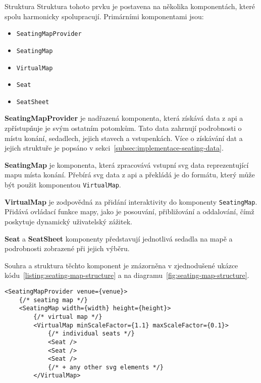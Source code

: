 \begin{subsection}{Struktura}
    \label{subsec:implementace-seating-struktura}
    Struktura tohoto prvku je postavena na několika komponentách, které spolu harmonicky spolupracují.
    Primárními komponentami jsou:

    \begin{itemize}
        \item \texttt{SeatingMapProvider}
        \item \texttt{SeatingMap}
        \item \texttt{VirtualMap}
        \item \texttt{Seat}
        \item \texttt{SeatSheet}
    \end{itemize}

    \textbf{SeatingMapProvider} je nadřazená komponenta, která získává data z \ac{api} a zpřístupňuje je svým ostatním potomkům.
    Tato data zahrnují podrobnosti o místu konání, sedadlech, jejich stavech a vstupenkách.
    Více o získávání dat a jejich struktuře je popsáno v sekci~\ref{subsec:implementace-seating-data}.

    \textbf{SeatingMap} je komponenta, která zpracovává vstupní \ac{svg} data reprezentující mapu místa konání.
    Přebírá \ac{svg} data z \ac{api} a překládá je do formátu, který může být použit komponentou \texttt{VirtualMap}.

    \textbf{VirtualMap} je zodpovědná za přidání interaktivity do komponenty \texttt{SeatingMap}.
    Přidává ovládací funkce mapy, jako je posouvání, přibližování a oddalování, čímž poskytuje dynamický uživatelský zážitek.

    \textbf{Seat} a \textbf{SeatSheet} komponenty představují jednotlivá sedadla na mapě a podrobnosti zobrazené při jejich výběru.

    Souhra a struktura těchto komponent je znázorněna v zjednodušené ukázce kódu~\ref{listing:seating-map-structure} a na diagramu~\ref{fig:seating-map-structure}.

    \begin{listing}[H]
        \begin{verbatim}
<SeatingMapProvider venue={venue}>
	{/* seating map */}
	<SeatingMap width={width} height={height}>
		{/* virtual map */}
		<VirtualMap minScaleFactor={1.1} maxScaleFactor={0.1}>
			{/* individual seats */}
			<Seat />
			<Seat />
			<Seat />
			{/* + any other svg elements */}
		</VirtualMap>


\end{verbatim}
\end{listing}
\end{subsection}

